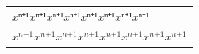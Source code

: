 \documentclass{unittest}
\begin{document}
\begin{tabular}{l}
\(xⁿ⁺¹xⁿ⁺¹xⁿ⁺¹xⁿ⁺¹xⁿ⁺¹xⁿ⁺¹xⁿ⁺¹xⁿ⁺¹\)
\\
\(
x^{\mathord{n}\mathbin{\texttt{+}}\mathord{1}}
x^{\mathord{n}\mathbin{\texttt{+}}\mathord{1}}
x^{\mathord{n}\mathbin{\texttt{+}}\mathord{1}}
x^{\mathord{n}\mathbin{\texttt{+}}\mathord{1}}
x^{\mathord{n}\mathbin{\texttt{+}}\mathord{1}}
x^{\mathord{n}\mathbin{\texttt{+}}\mathord{1}}
x^{\mathord{n}\mathbin{\texttt{+}}\mathord{1}}
x^{\mathord{n}\mathbin{\texttt{+}}\mathord{1}}
\)
\end{tabular}
\end{document}
